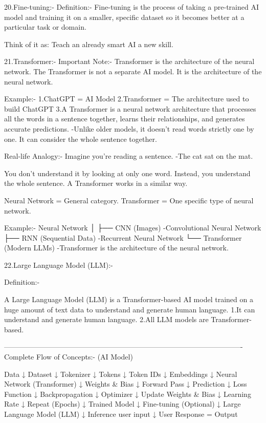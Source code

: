 20.Fine-tuning:-
Definition:-
Fine-tuning is the process of taking a pre-trained AI model and training it on a smaller, specific dataset so it becomes better at a particular task or domain.

Think of it as:
Teach an already smart AI a new skill.



21.Transformer:-
Important Note:-
Transformer is the architecture of the neural network.
The Transformer is not a separate AI model. It is the architecture of the neural network.

Example:-
1.ChatGPT = AI Model
2.Transformer = The architecture used to build ChatGPT
3.A Transformer is a neural network architecture that processes all the words in a sentence together,
learns their relationships, and generates accurate predictions.
-Unlike older models, it doesn't read words strictly one by one. It can consider the whole sentence together.

Real-life Analogy:-
Imagine you're reading a sentence.
  -The cat sat on the mat.

You don't understand it by looking at only one word.
Instead, you understand the whole sentence.
A Transformer works in a similar way.


Neural Network = General category.
Transformer = One specific type of neural network.

Example:-
Neural Network
│
├── CNN (Images) -Convolutional Neural Network
├── RNN (Sequential Data) -Recurrent Neural Network
└── Transformer (Modern LLMs) -Transformer is the architecture of the neural network.




22.Large Language Model (LLM):-

Definition:-

A Large Language Model (LLM) is a Transformer-based AI model trained on a huge amount of text data to understand and generate human language.
1.It can understand and generate human language.
2.All LLM models are Transformer-based.






----------------------------------------------------------------------------------------------------
Complete Flow of Concepts:- (AI Model)

Data
        ↓
Dataset
        ↓
Tokenizer
        ↓
Tokens
        ↓
Token IDs
        ↓
Embeddings
        ↓
Neural Network (Transformer)
        ↓
Weights & Bias
        ↓
Forward Pass
        ↓
Prediction
        ↓
Loss Function
        ↓
Backpropagation
        ↓
Optimizer
        ↓
Update Weights & Bias
        ↓
Learning Rate
        ↓
Repeat (Epochs)
        ↓
Trained Model
        ↓
Fine-tuning (Optional)
        ↓
Large Language Model (LLM)
        ↓
Inference user input
        ↓
User Response = Output





